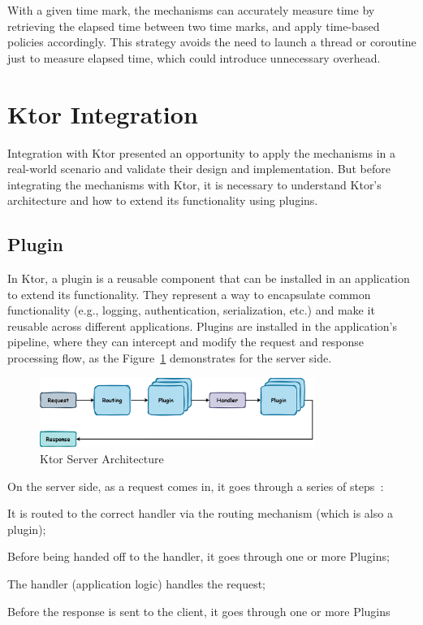With a given time mark,
the mechanisms can accurately measure time by retrieving the elapsed time between two time marks,
and apply time-based policies accordingly.
This strategy avoids the need to launch a thread or coroutine just to
measure elapsed time, which could introduce unnecessary overhead.


\section{Ktor Integration}\label{sec:ktor-integration}

Integration with Ktor presented an opportunity to apply the mechanisms in a real-world scenario
and validate their design and implementation.
But before integrating the mechanisms with Ktor, it is necessary to understand Ktor's architecture and how to extend its functionality using plugins.

\subsection{Plugin}\label{subsec:plugin}

In Ktor, a plugin is a reusable component that can be installed in an application to extend its functionality.
They represent a way to encapsulate common functionality (e.g., logging, authentication, serialization, etc.) and make it reusable across different applications.
Plugins are installed in the application's pipeline, where they can intercept and modify the request and response processing flow, as the Figure~\ref{fig:ktor-server-architecture} demonstrates for the server side.

\begin{figure}[!htb]
    \centering
    \includegraphics[width=0.8\textwidth]{../figures/03_ktor-server-architecture}
    \caption{Ktor Server Architecture}
    \label{fig:ktor-server-architecture}
\end{figure}

On the server side, as a request comes in, it goes through a series of steps~\cite{ktor-server-plugins}:

\begin{boldenumerate}
    \item It is routed to the correct handler via the routing mechanism (which is also a plugin);
    \item Before being handed off to the handler, it goes through one or more Plugins;
    \item The handler (application logic) handles the request;
    \item Before the response is sent to the client, it goes through one or more Plugins
\end{boldenumerate}

